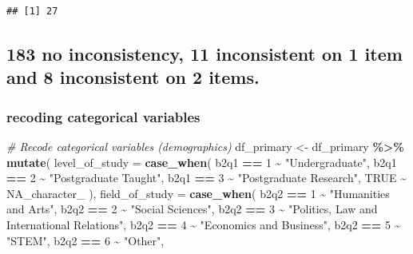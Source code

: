 \documentclass[
]{article}
\newenvironment{Shaded}{\begin{snugshade}}{\end{snugshade}}
\newcommand{\AttributeTok}[1]{\textcolor[rgb]{0.13,0.29,0.53}{#1}}
\newcommand{\CommentTok}[1]{\textcolor[rgb]{0.56,0.35,0.01}{\textit{#1}}}
\newcommand{\ConstantTok}[1]{\textcolor[rgb]{0.56,0.35,0.01}{#1}}
\newcommand{\DecValTok}[1]{\textcolor[rgb]{0.00,0.00,0.81}{#1}}
\newcommand{\FunctionTok}[1]{\textcolor[rgb]{0.13,0.29,0.53}{\textbf{#1}}}
\newcommand{\NormalTok}[1]{#1}
\newcommand{\OtherTok}[1]{\textcolor[rgb]{0.56,0.35,0.01}{#1}}
\newcommand{\SpecialCharTok}[1]{\textcolor[rgb]{0.81,0.36,0.00}{\textbf{#1}}}
\newcommand{\StringTok}[1]{\textcolor[rgb]{0.31,0.60,0.02}{#1}}
\begin{document}
\begin{verbatim}
## [1] 27
\end{verbatim}

\subsection{183 no inconsistency, 11 inconsistent on 1 item and 8
inconsistent on 2
items.}\label{no-inconsistency-11-inconsistent-on-1-item-and-8-inconsistent-on-2-items.}

\subsubsection{recoding categorical
variables}\label{recoding-categorical-variables}

\begin{Shaded}
\begin{Highlighting}[]
\CommentTok{\# Recode categorical variables (demographics)}
\NormalTok{df\_primary }\OtherTok{\textless{}{-}}\NormalTok{ df\_primary }\SpecialCharTok{\%\textgreater{}\%}
  \FunctionTok{mutate}\NormalTok{(}
    \AttributeTok{level\_of\_study =} \FunctionTok{case\_when}\NormalTok{(}
\NormalTok{      b2q1 }\SpecialCharTok{==} \DecValTok{1} \SpecialCharTok{\textasciitilde{}} \StringTok{"Undergraduate"}\NormalTok{,}
\NormalTok{      b2q1 }\SpecialCharTok{==} \DecValTok{2} \SpecialCharTok{\textasciitilde{}} \StringTok{"Postgraduate Taught"}\NormalTok{,}
\NormalTok{      b2q1 }\SpecialCharTok{==} \DecValTok{3} \SpecialCharTok{\textasciitilde{}} \StringTok{"Postgraduate Research"}\NormalTok{,}
      \ConstantTok{TRUE} \SpecialCharTok{\textasciitilde{}} \ConstantTok{NA\_character\_}
\NormalTok{    ),}
    \AttributeTok{field\_of\_study =} \FunctionTok{case\_when}\NormalTok{(}
\NormalTok{      b2q2 }\SpecialCharTok{==} \DecValTok{1} \SpecialCharTok{\textasciitilde{}} \StringTok{"Humanities and Arts"}\NormalTok{,}
\NormalTok{      b2q2 }\SpecialCharTok{==} \DecValTok{2} \SpecialCharTok{\textasciitilde{}} \StringTok{"Social Sciences"}\NormalTok{,}
\NormalTok{      b2q2 }\SpecialCharTok{==} \DecValTok{3} \SpecialCharTok{\textasciitilde{}} \StringTok{"Politics, Law and International Relations"}\NormalTok{,}
\NormalTok{      b2q2 }\SpecialCharTok{==} \DecValTok{4} \SpecialCharTok{\textasciitilde{}} \StringTok{"Economics and Business"}\NormalTok{,}
\NormalTok{      b2q2 }\SpecialCharTok{==} \DecValTok{5} \SpecialCharTok{\textasciitilde{}} \StringTok{"STEM"}\NormalTok{,}
\NormalTok{      b2q2 }\SpecialCharTok{==} \DecValTok{6} \SpecialCharTok{\textasciitilde{}} \StringTok{"Other"}\NormalTok{,}

\end{Highlighting}
\end{Shaded}
\end{document}
